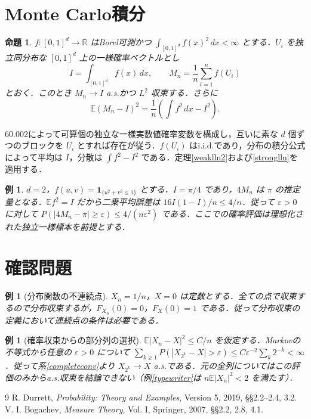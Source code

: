 \documentclass[a5paper,10pt,onecolumn]{jsarticle}
\makeatletter
\theoremstyle{mathnotetheorem}
\newtheorem{proposition}[theorem]{命題}
\newtheorem{example}[theorem]{例}
\renewcommand{\proofname}{証明}
\renewenvironment{proof}[1][\proofname]{%
  \par\pushQED{\qed}\normalfont\topsep4\p@\@plus2\p@\relax
  \trivlist\item[\hskip\labelsep\bfseries #1]\ignorespaces
}{\popQED\endtrivlist\@endpefalse}
\newcommand{\R}{\mathbb{R}}
\newcommand{\E}{\mathbb E}
\newcommand{\1}{\mathbf{1}}
\makeatother
\begin{document}
\section{Monte Carlo積分}
\begin{proposition}
$f:[0,1]^d\to\R$ はBorel可測かつ $\int_{[0,1]^d} f(x)^2\,dx<\infty$ とする．$U_i$ を独立同分布な $[0,1]^d$ 上の一様確率ベクトルとし
\[
 I=\int_{[0,1]^d}f(x)\,dx,\qquad M_n=\frac1n\sum_{i=1}^n f(U_i)
\]
とおく．このとき $M_n\to I$ a.s.かつ $L^2$ 収束する．さらに
\[
 \E(M_n-I)^2=\frac1n\left(\int f^2\,dx-I^2\right).
\]
\end{proposition}
\begin{proof}
60.002によって可算個の独立な一様実数値確率変数を構成し，互いに素な $d$ 個ずつのブロックを $U_i$ とすれば存在が従う．$f(U_i)$ はi.i.d.であり，分布の積分公式によって平均は $I$，分散は $\int f^2-I^2$ である．定理\ref{weaklln2}および\ref{stronglln}を適用する．
\end{proof}
\begin{example}
$d=2$，$f(u,v)=\1_{\{u^2+v^2\le1\}}$ とする．$I=\pi/4$ であり，$4M_n$ は $\pi$ の推定量となる．$\E f^2=I$ だから二乗平均誤差は $16I(1-I)/n\le4/n$．従って $\varepsilon>0$ に対して $P(|4M_n-\pi|\ge\varepsilon)\le4/(n\varepsilon^2)$ である．ここでの確率評価は理想化された独立一様標本を前提とする．
\end{example}
\section{確認問題}
\begin{example}[分布関数の不連続点]
$X_n=1/n$，$X=0$ は定数とする．全ての点で収束するので分布収束するが，$F_{X_n}(0)=0$，$F_X(0)=1$ である．従って分布収束の定義において連続点の条件は必要である．
\end{example}
\begin{example}[確率収束からの部分列の選択]
$\E|X_n-X|^2\le C/n$ を仮定する．Markovの不等式から任意の $\varepsilon>0$ について $\sum_{k\ge1}P(|X_{2^k}-X|>\varepsilon)\le C\varepsilon^{-2}\sum_k2^{-k}<\infty$．従って系\ref{completeconv}より $X_{2^k}\to X$ a.s.である．元の全列についてはこの評価のみからa.s.収束を結論できない（例\ref{typewriter}は $n\E|X_n|^2<2$ を満たす）．
\end{example}
\begin{thebibliography}{9}
 R. Durrett, \textit{Probability: Theory and Examples}, Version 5, 2019, \S\S2.2--2.4, 3.2.
 V. I. Bogachev, \textit{Measure Theory}, Vol. I, Springer, 2007, \S\S2.2, 2.8, 4.1.
\end{thebibliography}
\end{document}
